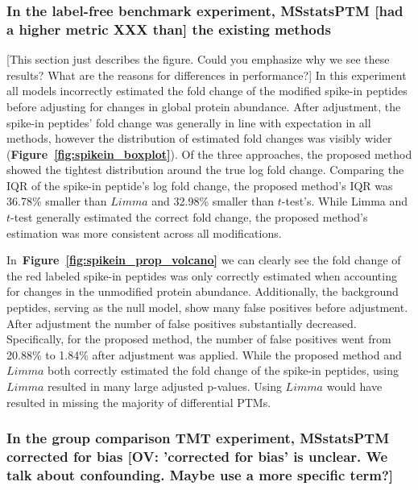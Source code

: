 \documentclass[mcp]{article}
\numberwithin{table}{section}
\def\todo#1{{\color{red}[#1]}}
\def\figref#1{{\bf Figure~\ref{fig:#1}}}
\begin{document}
\subsubsection*{In the label-free benchmark experiment, MSstatsPTM \todo{had a higher metric XXX than} the existing methods}

\todo{This section just describes the figure. Could you emphasize why we see these results? What are the reasons for differences in performance?} In this experiment all models incorrectly estimated the fold change of the modified spike-in peptides before adjusting for changes in global protein abundance. After adjustment, the spike-in peptides' fold change was generally in line with expectation in all methods, however the distribution of estimated fold changes was visibly wider (\figref{spikein_boxplot}). Of the three approaches, the proposed method showed the tightest distribution around the true log fold change. Comparing the IQR of the spike-in peptide's log fold change, the proposed method's IQR was 36.78\% smaller than $Limma$ and 32.98\% smaller than $t$-test's. While Limma and $t$-test generally estimated the correct fold change, the proposed method's estimation was more consistent across all modifications.

In~\figref{spikein_prop_volcano} we can clearly see the fold change of the red labeled spike-in peptides was only correctly estimated when accounting for changes in the unmodified protein abundance. Additionally, the background peptides, serving as the null model, show many false positives before adjustment. After adjustment the number of false positives substantially decreased. Specifically, for the proposed method, the number of false positives went from 20.88\% to 1.84\% after adjustment was applied. While the proposed method and $Limma$ both correctly estimated the fold change of the spike-in peptides, using $Limma$ resulted in many large adjusted p-values. Using $Limma$ would have resulted in missing the majority of differential PTMs.

\subsubsection*{In the group comparison TMT experiment, MSstatsPTM corrected for bias \todo{OV: 'corrected for bias' is unclear. We talk about confounding. Maybe use a more specific term?}}
\end{document}
